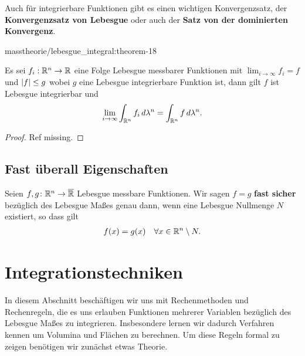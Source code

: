 \par
Auch für integrierbare Funktionen gibt es einen wichtigen Konvergenzsatz, der \textbf{Konvergenzsatz von Lebesgue} oder auch der \textbf{Satz von der dominierten Konvergenz}.
\begin{theorem}{}{masstheorie/lebesgue_integral:theorem-18}



\par
Es sei \(f_i:\mathbb{R}^n\to\mathbb{R}\) eine Folge Lebesgue messbarer Funktionen mit \(\lim_{i\to\infty} f_i =f\) und \(\vert f \vert\leq g\) wobei \(g\) eine Lebesgue integrierbare Funktion ist, dann gilt \(f\) ist Lebesgue integrierbar und
\begin{align*}
\lim_{i\to\infty} \int_{\mathbb{R}^n} f_i\, d\lambda^n = \int_{\mathbb{R}^n} f\, d\lambda^n.
\end{align*}\end{theorem}

\begin{proof}
 Ref missing.
\end{proof}


\subsection{Fast überall Eigenschaften}
\begin{definition}{}{}\label{masstheorie/lebesgue_integral:definition-19}



\par
Seien \(f,g \colon \mathbb{R}^n \rightarrow \overline{\mathbb{R}}\) Lebesgue messbare Funktionen.
Wir sagen \(f = g\) \textbf{fast sicher} bezüglich des Lebesgue Maßes genau dann, wenn eine Lebesgue Nullmenge \(N\) existiert, so dass gilt
\begin{align*}
f(x) = g(x) \quad \forall x \in \mathbb{R}^n \setminus N.
\end{align*}\end{definition}


\section{Integrationstechniken}
\label{\detokenize{masstheorie/integrationstechnik:integrationstechniken}}\label{\detokenize{masstheorie/integrationstechnik::doc}}
\par
In diesem Abschnitt beschäftigen wir uns mit Rechenmethoden und Rechenregeln, die es uns erlauben Funktionen mehrerer Variablen bezüglich des Lebesgue Maßes zu integrieren. Insbesondere lernen wir dadurch Verfahren kennen um Volumina und Flächen zu berechnen. Um diese Regeln formal zu zeigen benötigen wir zunächst etwas Theorie.


